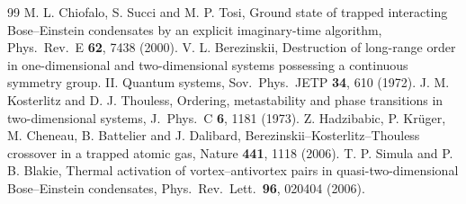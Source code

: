 \documentclass[11pt,a4paper]{article}
\begin{document}
\begin{thebibliography}{99}
 M. L. Chiofalo, S. Succi and M. P. Tosi, Ground state of trapped interacting Bose--Einstein condensates by an explicit imaginary-time algorithm, Phys.\ Rev.\ E \textbf{62}, 7438 (2000).
 V. L. Berezinskii, Destruction of long-range order in one-dimensional and two-dimensional systems possessing a continuous symmetry group. II. Quantum systems, Sov.\ Phys.\ JETP \textbf{34}, 610 (1972).
 J. M. Kosterlitz and D. J. Thouless, Ordering, metastability and phase transitions in two-dimensional systems, J.\ Phys.\ C \textbf{6}, 1181 (1973).
 Z. Hadzibabic, P. Kr\"uger, M. Cheneau, B. Battelier and J. Dalibard, Berezinskii--Kosterlitz--Thouless crossover in a trapped atomic gas, Nature \textbf{441}, 1118 (2006).
 T. P. Simula and P. B. Blakie, Thermal activation of vortex--antivortex pairs in quasi-two-dimensional Bose--Einstein condensates, Phys.\ Rev.\ Lett.\ \textbf{96}, 020404 (2006).

\end{thebibliography}
\end{document}
